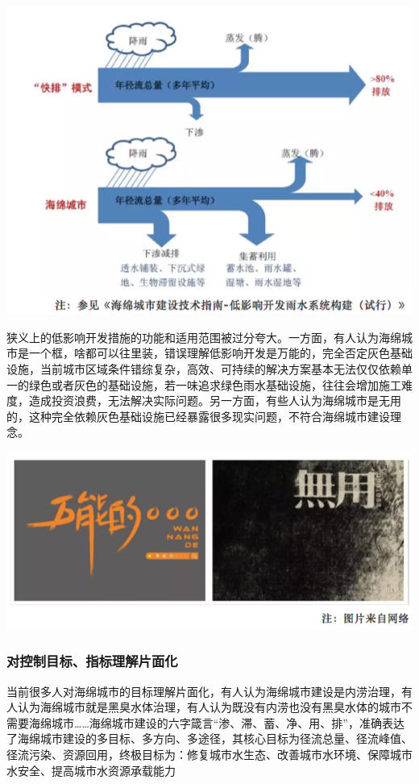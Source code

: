 \documentclass[]{book}
\begin{document}
\includegraphics[width=8.33in]{images/hm2}

狭义上的低影响开发措施的功能和适用范围被过分夸大。一方面，有人认为海绵城市是一个框，啥都可以往里装，错误理解低影响开发是万能的，完全否定灰色基础设施，当前城市区域条件错综复杂，高效、可持续的解决方案基本无法仅仅依赖单一的绿色或者灰色的基础设施，若一味追求绿色雨水基础设施，往往会增加施工难度，造成投资浪费，无法解决实际问题。另一方面，有些人认为海绵城市是无用的，这种完全依赖灰色基础设施已经暴露很多现实问题，不符合海绵城市建设理念。

\includegraphics[width=8.33in]{images/hm3}

\subsubsection{对控制目标、指标理解片面化}

当前很多人对海绵城市的目标理解片面化，有人认为海绵城市建设是内涝治理，有人认为海绵城市就是黑臭水体治理，有人认为既没有内涝也没有黑臭水体的城市不需要海绵城市\ldots{}\ldots{}海绵城市建设的六字箴言``渗、滞、蓄、净、用、排''，准确表达了海绵城市建设的多目标、多方向、多途径，其核心目标为径流总量、径流峰值、径流污染、资源回用，终极目标为：修复城市水生态、改善城市水环境、保障城市水安全、提高城市水资源承载能力
\end{document}
